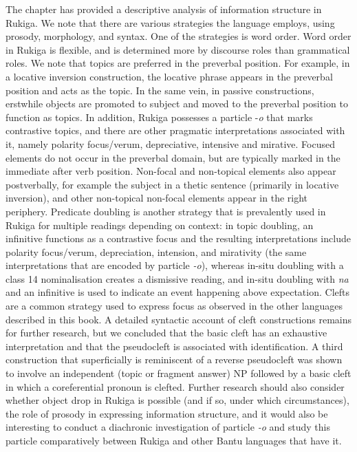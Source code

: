 \documentclass[output=paper]{langscibook}
\begin{document}
The chapter has provided a descriptive analysis of information structure in Rukiga. We note that there are various strategies the language employs, using prosody, morphology, and syntax. One of the strategies is word order. Word order in Rukiga is flexible, and is determined more by discourse roles than grammatical roles. We note that topics are preferred in the preverbal position. For example, in a locative inversion construction, the locative phrase appears in the preverbal position and acts as the topic. In the same vein, in passive constructions, erstwhile objects are promoted to subject and moved to the preverbal position to function as topics. In addition, Rukiga possesses a particle -\textit{o} that marks contrastive topics, and there are other pragmatic interpretations associated with it, namely polarity focus/verum, depreciative, intensive and mirative. Focused elements do not occur in the preverbal domain, but are typically marked in the immediate after verb position. Non-focal and non-topical elements also appear postverbally, for example the subject in a thetic sentence (primarily in locative inversion), and other non-topical non-focal elements appear in the right periphery. Predicate doubling is another strategy that is prevalently used in Rukiga for multiple readings depending on context: in topic doubling, an infinitive functions as a contrastive focus and the resulting interpretations include polarity focus/verum, depreciation, intension, and mirativity (the same interpretations that are encoded by particle \textit{-o}), whereas in-situ doubling with a class 14 nominalisation creates a dismissive reading, and in-situ doubling with \textit{na} and an infinitive is used to indicate an event happening above expectation. Clefts are a common strategy used to express focus as observed in the other languages described in this book. A detailed syntactic account of cleft constructions remains for further research, but we concluded that the basic cleft has an exhaustive interpretation and that the pseudocleft is associated with identification. A third construction that superficially is reminiscent of a reverse pseudocleft was shown to involve an independent (topic or fragment answer) NP followed by a basic cleft in which a coreferential pronoun is clefted. Further research should also consider whether object drop in Rukiga is possible (and if so, under which circumstances), the role of prosody in expressing information structure, and it would also be interesting to conduct a diachronic investigation of particle \textit{-o} and study this particle comparatively between Rukiga and other Bantu languages that have it.
\end{document}
